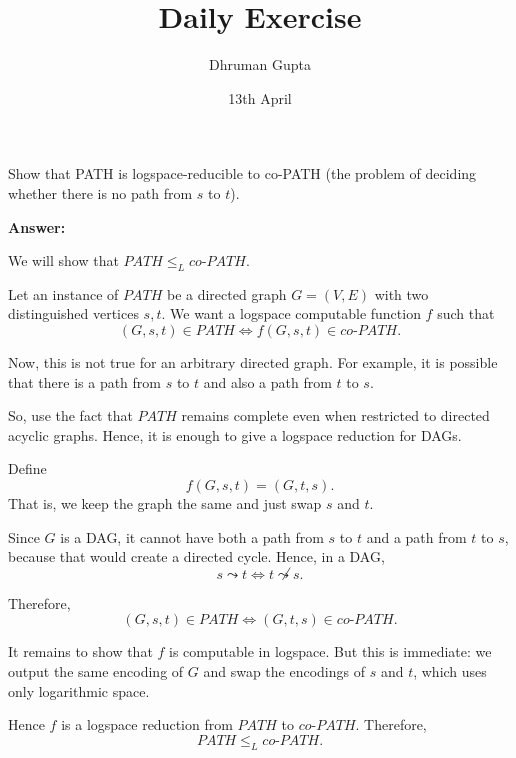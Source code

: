 \documentclass[11pt]{article}
\title{Daily Exercise}
\author{Dhruman Gupta}
\date{13th April}
\begin{document}

Show that PATH is logspace-reducible to co-PATH (the problem of deciding whether there is no path from $s$ to $t$).

\textbf{Answer:}

We will show that $PATH \leq_L co\text{-}PATH$.

Let an instance of $PATH$ be a directed graph $G = (V,E)$ with two distinguished vertices $s,t$. We want a logspace computable function $f$ such that
\[
(G,s,t) \in PATH \iff f(G,s,t) \in co\text{-}PATH.
\]

Now, this is not true for an arbitrary directed graph. For example, it is possible that there is a path from $s$ to $t$ and also a path from $t$ to $s$.

So, use the fact that $PATH$ remains complete even when restricted to directed acyclic graphs. Hence, it is enough to give a logspace reduction for DAGs.

Define
\[
f(G,s,t) = (G,t,s).
\]
That is, we keep the graph the same and just swap $s$ and $t$.

Since $G$ is a DAG, it cannot have both a path from $s$ to $t$ and a path from $t$ to $s$, because that would create a directed cycle. Hence, in a DAG,
\[
s \leadsto t \iff t \not\leadsto s.
\]

Therefore,
\[
(G,s,t) \in PATH \iff (G,t,s) \in co\text{-}PATH.
\]

It remains to show that $f$ is computable in logspace. But this is immediate: we output the same encoding of $G$ and swap the encodings of $s$ and $t$, which uses only logarithmic space.

Hence $f$ is a logspace reduction from $PATH$ to $co\text{-}PATH$. Therefore,
\[
PATH \leq_L co\text{-}PATH.
\]
\end{document}

